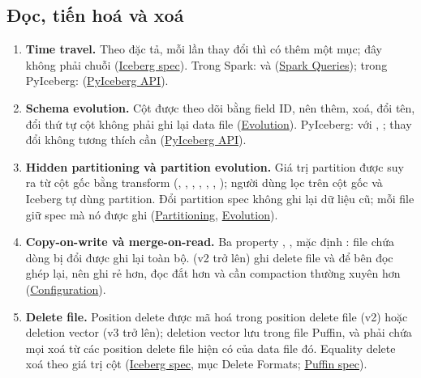 \subsection{Đọc, tiến hoá và xoá}
\begin{enumerate}[resume]
  \item \textbf{Time travel.} Theo đặc tả, mỗi lần  thay đổi thì  có thêm một mục; đây không phải chuỗi  (\href{https://iceberg.apache.org/spec/}{Iceberg spec}). Trong Spark:  và  (\href{https://iceberg.apache.org/docs/latest/spark-queries/}{Spark Queries}); trong PyIceberg:  (\href{https://py.iceberg.apache.org/api/}{PyIceberg API}).
  \item \textbf{Schema evolution.} Cột được theo dõi bằng field ID, nên thêm, xoá, đổi tên, đổi thứ tự cột không phải ghi lại data file (\href{https://iceberg.apache.org/docs/latest/evolution/}{Evolution}). PyIceberg:  với , ; thay đổi không tương thích cần  (\href{https://py.iceberg.apache.org/api/}{PyIceberg API}).
  \item \textbf{Hidden partitioning và partition evolution.} Giá trị partition được suy ra từ cột gốc bằng transform (, , , , , , ); người dùng lọc trên cột gốc và Iceberg tự dùng partition. Đổi partition spec không ghi lại dữ liệu cũ; mỗi file giữ spec mà nó được ghi (\href{https://iceberg.apache.org/docs/latest/partitioning/}{Partitioning}, \href{https://iceberg.apache.org/docs/latest/evolution/}{Evolution}).
  \item \textbf{Copy-on-write và merge-on-read.} Ba property , ,  mặc định : file chứa dòng bị đổi được ghi lại toàn bộ.  (v2 trở lên) ghi delete file và để bên đọc ghép lại, nên ghi rẻ hơn, đọc đắt hơn và cần compaction thường xuyên hơn (\href{https://iceberg.apache.org/docs/latest/configuration/}{Configuration}).
  \item \textbf{Delete file.} Position delete được mã hoá trong position delete file (v2) hoặc deletion vector (v3 trở lên); deletion vector lưu trong file Puffin, và phải chứa mọi xoá từ các position delete file hiện có của data file đó. Equality delete xoá theo giá trị cột (\href{https://iceberg.apache.org/spec/}{Iceberg spec}, mục Delete Formats; \href{https://github.com/apache/iceberg/blob/main/format/puffin-spec.md}{Puffin spec}).
\end{enumerate}

